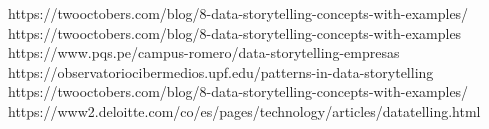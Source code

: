 \documentclass[preprint,12pt]{elsarticle}
\begin{document}
	
	
	\newpage
	
	   \begin{thebibliography}{0}
                 https://twooctobers.com/blog/8-data-storytelling-concepts-with-examples/
                  https://twooctobers.com/blog/8-data-storytelling-concepts-with-examples
                   https://www.pqs.pe/campus-romero/data-storytelling-empresas
                   https://observatoriocibermedios.upf.edu/patterns-in-data-storytelling
                     https://twooctobers.com/blog/8-data-storytelling-concepts-with-examples/
                   https://www2.deloitte.com/co/es/pages/technology/articles/datatelling.html

         \end{thebibliography}

	
\end{document}
